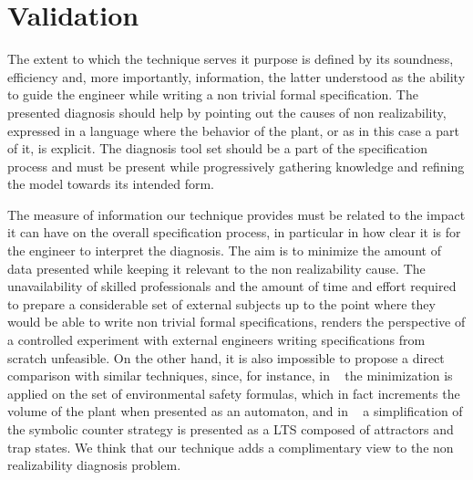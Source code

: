 \section{Validation}\label{sec:validation}
The extent to which the technique serves it purpose is defined by its soundness, efficiency and, more importantly, information, the latter understood as the ability to guide the engineer while writing a non trivial formal specification. The presented diagnosis should help by pointing out the causes of non realizability, expressed in a language where the behavior of the plant, or as in this case a part of it, is explicit. The diagnosis tool set should be a part of the specification process and must be present while progressively gathering knowledge and refining the model towards its intended form.

The measure of information our technique provides must be related to the impact it can have on the overall specification process, in particular in how clear it is for the engineer  to interpret the diagnosis. The aim is to minimize the amount of data presented while keeping it relevant to the non realizability cause. The unavailability of skilled professionals and the amount of time and effort required to prepare a considerable set of external subjects up to the point where they would be able to write non trivial formal specifications, renders the perspective of a controlled experiment with external engineers writing specifications from scratch unfeasible. On the other hand, it is also impossible to propose a direct comparison with similar techniques, since, for instance, in ~\cite{DBLP:conf/hvc/KonighoferHB10} the minimization is applied on the set of environmental safety formulas, which in fact increments the volume of the plant when presented as an automaton, and in ~\cite{DBLP:conf/sigsoft/KuventMR17} a simplification of the symbolic counter strategy is presented as a LTS composed of attractors and trap states. We think that our technique adds a complimentary view to the non realizability diagnosis problem.

